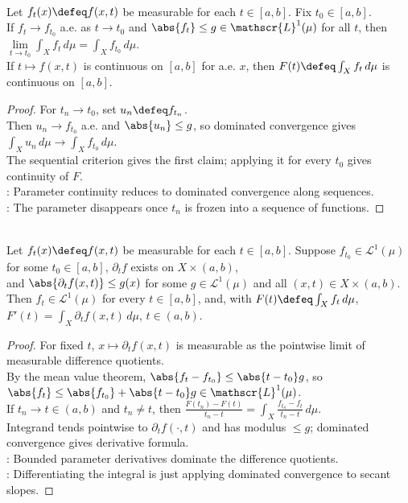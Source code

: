 \begin{corollary} \label{cor:dominated-parameter-continuity} \\
Let $f_t(x)\defeq f(x,t)$ be measurable for each $t\in[a,b]$. Fix $t_0\in[a,b]$.\\
If $f_t\to f_{t_0}$ a.e. as $t\to t_0$ and $\abs{f_t}\leq g\in\mathscr{L}^1(\mu)$ for all $t$, then $\lim\limits_{t\to t_0}\int_X f_t\,d\mu=\int_X f_{t_0}\,d\mu$.\\
If $t\mapsto f(x,t)$ is continuous on $[a,b]$ for a.e. $x$, then $F(t)\defeq\int_X f_t\,d\mu$ is continuous on $[a,b]$.
\begin{proof}
For $t_n\to t_0$, set $u_n\defeq f_{t_n}$.\\
Then $u_n\to f_{t_0}$ a.e. and $\abs{u_n}\leq g$, so dominated convergence gives $\int_Xu_n\,d\mu\to\int_Xf_{t_0}\,d\mu$.\\
The sequential criterion gives the first claim; applying it for every $t_0$ gives continuity of $F$.\\
: Parameter continuity reduces to dominated convergence along sequences.\\
: The parameter disappears once $t_n$ is frozen into a sequence of functions.
\end{proof}
\end{corollary}

\begin{theorem} \label{thm:differentiation-under-lebesgue-integral} \\
Let $f_t(x)\defeq f(x,t)$ be measurable for each $t\in[a,b]$. Suppose $f_{t_0}\in\mathscr{L}^1(\mu)$ for some $t_0\in[a,b]$, $\partial_tf$ exists on $X\times(a,b)$,\\
and $\abs{\partial_tf(x,t)}\leq g(x)$ for some $g\in\mathscr{L}^1(\mu)$ and all $(x,t)\in X\times(a,b)$.\\
Then $f_t\in\mathscr{L}^1(\mu)$ for every $t\in[a,b]$, and, with $F(t)\defeq\int_Xf_t\,d\mu$, $F'(t)=\int_X \partial_tf(x,t)\,d\mu$, $t\in(a,b)$.
\begin{proof}
For fixed $t$, $x\mapsto\partial_tf(x,t)$ is measurable as the pointwise limit of measurable difference quotients.\\
By the mean value theorem, $\abs{f_t-f_{t_0}}\leq \abs{t-t_0}g$, so $\abs{f_t}\leq\abs{f_{t_0}}+\abs{t-t_0}g\in\mathscr{L}^1(\mu)$.\\
If $t_n\to t\in(a,b)$ and $t_n\neq t$, then $\frac{F(t_n)-F(t)}{t_n-t} =\int_X\frac{f_{t_n}-f_t}{t_n-t}\,d\mu$.\\
Integrand tends pointwise to $\partial_tf(\cdot,t)$ and has modulus $\leq g$; dominated convergence gives derivative formula.\\
: Bounded parameter derivatives dominate the difference quotients.\\
: Differentiating the integral is just applying dominated convergence to secant slopes.
\end{proof}
\end{theorem}

